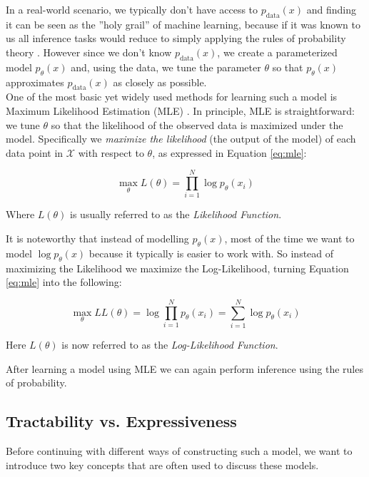 In a real-world scenario, we typically don't have access to $p_{\text{data}}(x)$ and finding it can be seen as the ''holy grail'' of machine learning, because if it was known to us all inference tasks would reduce to simply applying the 
rules of probability theory \cite{pc_intro}. However since we don't know $p_{\text{data}}(x)$,
we create a parameterized model $p_\theta(x)$ and, using the data, we tune the parameter $\theta$ so that $p_\theta(x)$ approximates $p_{\text{data}}(x)$ as closely as possible. \\

One of the most basic yet widely used methods for learning such a model is Maximum Likelihood Estimation (MLE) \cite{ml_book}. 
In principle, MLE is straightforward: we tune $\theta$ so that the likelihood of the observed data is maximized under the model.
Specifically we \emph{maximize the likelihood} (the output of the model) of each data point in $\mathcal{X}$ with respect to $\theta$, as 
expressed in Equation \ref{eq:mle}: 

\begin{equation}
    \max_{\theta} L(\theta) = \prod_{i=1}^{N} \log p_\theta(x_i)
    \label{eq:mle}
\end{equation}

Where $L(\theta)$ is usually referred to as the \emph{Likelihood Function}.

It is noteworthy that instead of modelling $p_\theta(x)$, most of the time we want to model $\log p_\theta(x)$ because it typically is easier to work with. 
So instead of maximizing the Likelihood we maximize the Log-Likelihood, turning Equation \ref{eq:mle} into the following:

\begin{equation}
    \max_{\theta} LL(\theta) = \log \prod_{i=1}^{N} p_\theta(x_i) = \sum_{i=1}^{N} \log p_\theta(x_i)
    \label{eq:log_mle}
\end{equation}

Here $L(\theta)$ is now referred to as the \emph{Log-Likelihood Function}. 

After learning a model using MLE we can again perform inference using the rules of probability. 

\subsection{Tractability vs. Expressiveness}

Before continuing with different ways of constructing such a model, we want to introduce two key concepts that are often 
used to discuss these models. 

